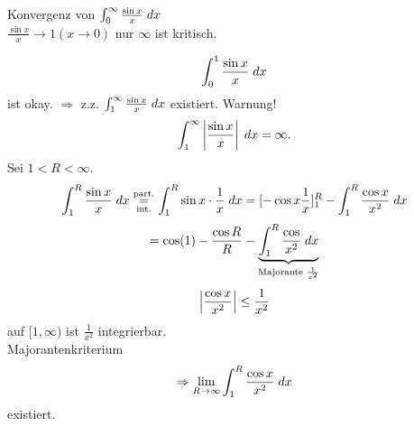 \documentclass[../ana2.tex]{subfiles}
\begin{document}
\begin{bsp}
    Konvergenz von \( \integral{\frac{\sin x}{x}}{0}{\infty} \) \\
    \( \frac{\sin x}{x} \rightarrow 1 (x \rightarrow 0) \)
    nur \( \infty \) ist kritisch.
\end{bsp}
\begin{bew}
    \[ \integral{\frac{\sin x}{x}}{0}{1} \]
    ist okay.
    \( \Rightarrow \) z.z. \( \integral{\frac{\sin x}{x}}{1}{\infty} \)
    existiert.    
    Warnung!
    \[ \integral{\abs{\frac{\sin x}{x}}}{1}{\infty} 
    = \infty. \]
    Sei \( 1 < R < \infty \).
    \[ \integral{\frac{\sin x}{x}}{1}{R} 
    \overundersett{part.}{int.}{=}
    \integral{\sin x \cdot \frac{1}{x}}{1}{R} 
    = [-\cos x \frac{1}{x}]_1^R 
    - \integral{\frac{\cos x}{x^2}}{1}{R} \]
    \[ = \cos(1) - \frac{\cos R}{R} 
    - \underbrace{\integral{\frac{\cos}{x^2}}{1}{R}}
    _{\text{Majorante } \frac{1}{x^2}} \]
    \[ \abs{\frac{\cos x}{x^2}} \leq \frac{1}{x^2} \]
    auf \( [1,\infty) \) ist \( \frac{1}{x^2} \) 
    integrierbar.\\
    Majorantenkriterium 
    \[ \Rightarrow \limes{R} 
    \integral{\frac{\cos x}{x^2}}{1}{R} \]
    existiert.
\end{bew}
\end{document}

